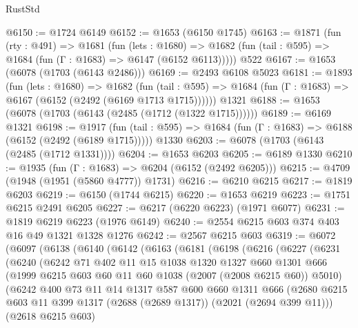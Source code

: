 \begin{lexlean}{RustStd}
\begin{coremodule}
{\begin{coremodule}
{{{{{{{{{{{{{{{{@6150 := @1724 @6149
@6152 := @1653 (@6150 @1745)
@6163 := @1871
    (fun (rty : @491) =>
    @1681
      (fun (lets : @1680) =>
      @1682 (fun (tail : @595) => @1684 (fun (Γ : @1683) => @6147 (@6152 @6113)))))
    @522
@6167 := @1653 (@6078 (@1703 (@6143 @2486)))
@6169 := @2493 @6108 @5023
@6181 := @1893
    (fun (lets : @1680) =>
    @1682
      (fun (tail : @595) => @1684 (fun (Γ : @1683) => @6167 (@6152 (@2492 (@6169 @1713 @1715))))))
    @1321
@6188 := @1653 (@6078 (@1703 (@6143 (@2485 (@1712 (@1322 @1715))))))
@6189 := @6169 @1321
@6198 := @1917
    (fun (tail : @595) => @1684 (fun (Γ : @1683) => @6188 (@6152 (@2492 (@6189 @1715)))))
    @1330
@6203 := @6078 (@1703 (@6143 (@2485 (@1712 @1331))))
@6204 := @1653 @6203
@6205 := @6189 @1330
@6210 := @1935 (fun (Γ : @1683) => @6204 (@6152 (@2492 @6205)))
@6215 := @4709 (@1948 (@1951 (@5860 @4777)) @1731)
@6216 := @6210 @6215
@6217 := @1819 @6203
@6219 := @6150 (@1744 @6215)
@6220 := @1653 @6219
@6223 := @1751 @6215 @2491 @6205
@6227 := @6217 (@6220 @6223) (@1971 @6077)
@6231 := @1819 @6219 @6223 (@1976 @6149)
@6240 := @2554 @6215 @603 @374 @403 @16 @49 @1321 @1328 @1276
@6242 := @2567 @6215 @603
@6319 := @6072
    (@6097
      (@6138
        (@6140
          (@6142
            (@6163
              (@6181
                (@6198
                  (@6216
                    (@6227
                      (@6231
                        (@6240
                          (@6242
                            @71
                            @402
                            @11
                            @15
                            @1038
                            @1320
                            @1327
                            @660
                            @1301
                            @666
                            (@1999 @6215 @603 @60 @11 @60 @1038 (@2007 (@2008 @6215 @60)) @5010)
                            (@6242
                              @400
                              @73
                              @11
                              @14
                              @1317
                              @587
                              @600
                              @660
                              @1311
                              @666
                              (@2680
                                @6215
                                @603
                                @11
                                @399
                                @1317
                                (@2688 (@2689 @1317))
                                (@2021 (@2694 @399 @11)))
                              (@2618 @6215 @603)
}}}}}}}}}}}}}}}}
\end{coremodule}}
\end{coremodule}
\end{lexlean}
